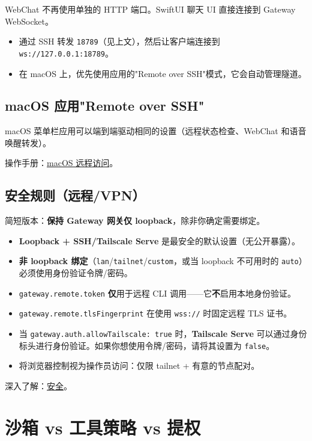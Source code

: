 WebChat 不再使用单独的 HTTP 端口。SwiftUI 聊天 UI 直接连接到 Gateway WebSocket。

\begin{itemize}
  \item 通过 SSH 转发 \texttt{18789}（见上文），然后让客户端连接到 \texttt{ws://127.0.0.1:18789}。
  \item 在 macOS 上，优先使用应用的"Remote over SSH"模式，它会自动管理隧道。
\end{itemize}


\subsection{macOS 应用"Remote over SSH"}


macOS 菜单栏应用可以端到端驱动相同的设置（远程状态检查、WebChat 和语音唤醒转发）。

操作手册：\href{/platforms/mac/remote}{macOS 远程访问}。

\subsection{安全规则（远程/VPN）}


简短版本：\textbf{保持 Gateway 网关仅 loopback}，除非你确定需要绑定。

\begin{itemize}
  \item \textbf{Loopback + SSH/Tailscale Serve} 是最安全的默认设置（无公开暴露）。
  \item \textbf{非 loopback 绑定}（\texttt{lan}/\texttt{tailnet}/\texttt{custom}，或当 loopback 不可用时的 \texttt{auto}）必须使用身份验证令牌/密码。
  \item \texttt{gateway.remote.token} \textbf{仅}用于远程 CLI 调用——它\textbf{不}启用本地身份验证。
  \item \texttt{gateway.remote.tlsFingerprint} 在使用 \texttt{wss://} 时固定远程 TLS 证书。
  \item 当 \texttt{gateway.auth.allowTailscale: true} 时，\textbf{Tailscale Serve} 可以通过身份标头进行身份验证。如果你想使用令牌/密码，请将其设置为 \texttt{false}。
  \item 将浏览器控制视为操作员访问：仅限 tailnet + 有意的节点配对。
\end{itemize}


深入了解：\href{/gateway/security}{安全}。


\clearpage

\section{沙箱 vs 工具策略 vs 提权}


